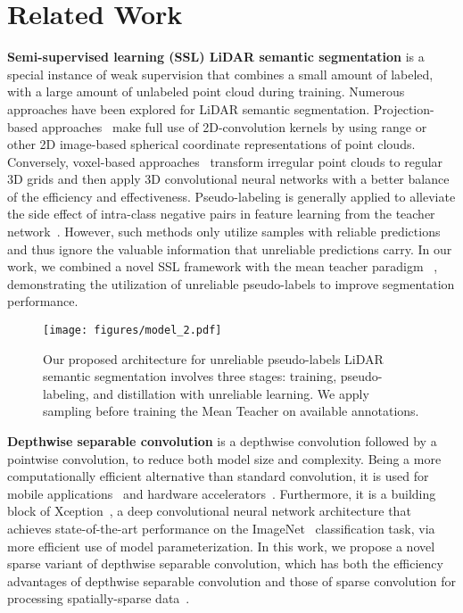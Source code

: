 \documentclass[10pt,twocolumn,letterpaper]{article}
\newcommand\bdtitle[1]{\noindent\textbf{#1}}
\begin{document}
 \section{Related Work}

\bdtitle{Semi-supervised learning (SSL) LiDAR semantic segmentation} is a special instance of weak supervision that combines a small amount of labeled, with a large amount of unlabeled point cloud during training. Numerous approaches have been explored for LiDAR semantic segmentation. Projection-based approaches~\cite{kong2022lasermix,wu2018squeezesega,wu2019squeezesegv2a,milioto2019rangenet,kochanov2020kprnet,xu2020squeezesegv3,liong2020amvnet} make full use of 2D-convolution kernels by using range or other 2D image-based spherical coordinate representations of point clouds. Conversely, voxel-based approaches~\cite{tang2020searching,zhu2021cylindrical,kong2022lasermix,Unal_2022_CVPR} transform irregular point clouds to regular 3D grids and then apply 3D convolutional neural networks with a better balance of the efficiency and effectiveness. Pseudo-labeling is generally applied to alleviate the side effect of intra-class negative pairs in feature learning from the teacher network~\cite{jiang2021guided,yan2021sparse,Unal_2022_CVPR,kong2022lasermix}. However, such methods only utilize samples with reliable predictions and thus ignore the valuable information that unreliable predictions carry. In our work, we combined a novel SSL framework with the mean teacher paradigm ~\cite{tarvainen2017mean}, demonstrating the utilization of unreliable pseudo-labels to improve segmentation performance.

\begin{figure*}[thp]
    \centering
    \texttt{[image: figures/model\_2.pdf]}
     \caption{Our proposed architecture for unreliable pseudo-labels LiDAR semantic segmentation involves three stages: training, pseudo-labeling, and distillation with unreliable learning. We apply {\samplshort} sampling before training the Mean Teacher on available annotations.}
    \vspace{-0.3cm}
    \label{fig:model}
\end{figure*}

\bdtitle{Depthwise separable convolution}\cite{sifre2014rigidmotiona} is a depthwise convolution followed by a pointwise convolution, to reduce both model size and complexity. Being a more computationally efficient alternative than standard convolution, it is used for mobile applications~\cite{howard2017mobilenets,sandler2018mobilenetv2,howard2019searching} and hardware accelerators~\cite{masters2021making}. Furthermore, it is a building block of Xception~\cite{chollet2017xception}, a deep convolutional neural network architecture that achieves state-of-the-art performance on the ImageNet~\cite{deng2009imagenet} classification task, via more efficient use of model parameterization. In this work, we propose a novel sparse variant of depthwise separable convolution, which has both the efficiency advantages of depthwise separable convolution and those of sparse convolution for processing spatially-sparse data~\cite{graham20183d}.
\end{document}
